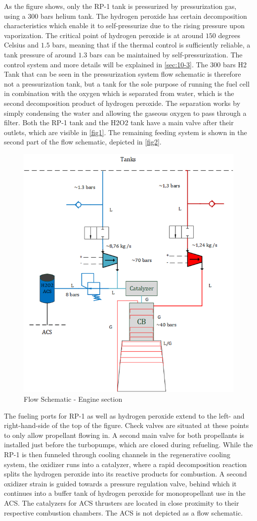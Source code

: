 As the figure shows, only the RP-1 tank is pressurized by pressurization gas, using a $300$ bars helium tank. The hydrogen peroxide has certain decomposition characteristics which enable it to self-pressurize due to the rising pressure upon vaporization. The critical point of hydrogen peroxide is at around $150$ degrees Celsius and $1.5$ bars, meaning that if the thermal control is sufficiently reliable, a tank pressure of around $1.3$ bars can be maintained by self-pressurization. The control system and more details will be explained in \autoref{sec:10-3}. The $300$ bars H2 Tank that can be seen in the pressurization system flow schematic is therefore not a pressurization tank, but a tank for the sole purpose of running the fuel cell in combination with the oxygen which is separated from water, which is the second decomposition product of hydrogen peroxide. The separation works by simply condensing the water and allowing the gaseous oxygen to pass through a filter. Both the RP-1 tank and the H2O2 tank have a main valve after their outlets, which are visible in \autoref{fig1}. The remaining feeding system is shown in the second part of the flow schematic, depicted in \autoref{fig2}.

\begin{figure}[H]
	\centering\includegraphics[width=0.7\linewidth]{flowenginesection}
	\caption{Flow Schematic - Engine section}\label{fig2}
\end{figure}
The fueling ports for RP-1 as well as hydrogen peroxide extend to the left- and right-hand-side of the top of the figure. Check valves are situated at these points to only allow propellant flowing in. A second main valve for both propellants is installed just before the turbopumps, which are closed during refueling. While the RP-1 is then funneled through cooling channels in the regenerative cooling system, the oxidizer runs into a catalyzer, where a rapid decomposition reaction splits the hydrogen peroxide into its reactive products for combustion. A second oxidizer strain is guided towards a pressure regulation valve, behind which it continues into a buffer tank of hydrogen peroxide for monopropellant use in the ACS. The catalyzers for ACS thrusters are located in close proximity to their respective combustion chambers. The ACS is not depicted as a flow schematic.

